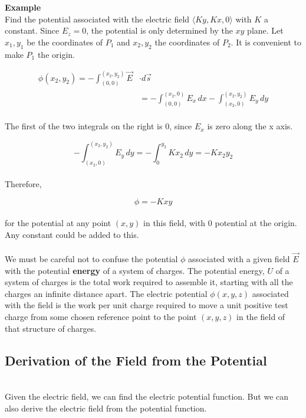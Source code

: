 \documentclass[svgnames]{article}
\begin{document}
\textbf{Example} \\
Find the potential associated with the electric field $\langle Ky, Kx, 0 \rangle$ with $K$ a constant. Since $E_z = 0$, the potential is only determined by the $xy$ plane. Let $x_1, y_1$ be the coordinates of $P_1$ and $x_2, y_2$ the coordinates of $P_2$. It is convenient to make $P_1$ the origin. 

\begin{align*} 
\phi(x_2, y_2) = -\int_{(0,0)}^{(x_2,y_2)} \vec{E} &\cdot d\vec{s} \\ 
& = - \int_{(0,0)}^{(x_2, 0)} E_x \, dx - \int_{(x_2, 0)}^{(x_2, y_2)} E_y \, dy 
\end{align*} \\

The first of the two integrals on the right is 0, since $E_x$ is zero along the x axis. 

\[ -\int_{(x_2, 0)}^{(x_2, y_2)} E_y \, dy = -\int_0^{y_2} Kx_2\,dy = -Kx_2y_2 \] \\

Therefore, 

\[ \phi = -Kxy \] \\

for the potential at any point $(x,y)$ in this field, with 0 potential at the origin. Any constant could be added to this. \\ \\ 

We must be careful not to confuse the potential $\phi$ associated with a given field $\vec{E}$ with the potential \textbf{energy} of a system of charges. The potential energy, $U$ of a system of charges is the total work required to assemble it, starting with all the charges an infinite distance apart. The electric potential $\phi(x, y, z)$ associated with the field is the work per unit charge required to move a unit positive test charge from some chosen reference point to the point $(x, y, z)$ in the field of that structure of charges. \\

\subsection{Derivation of the Field from the Potential}  \mbox{} \\ 

Given the electric field, we can find the electric potential function. But we can also derive the electric field from the potential function. \\
\end{document}

